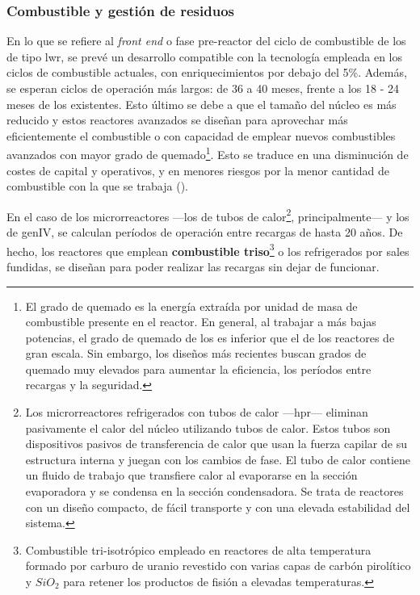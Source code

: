 \newpage
\subsubsection{Combustible y gestión de residuos} \label{combustible}

En lo que se refiere al \emph{front end} o fase pre-reactor del ciclo de combustible de los  de tipo \acrshort{lwr}, se prevé un desarrollo compatible con la tecnología empleada en los ciclos de combustible actuales, con enriquecimientos  por debajo del 5\%. Además, se esperan ciclos de operación más largos: de 36 a 40 meses, frente a los 18 - 24 meses de los  existentes. Esto último se debe a que el tamaño del núcleo es más reducido y estos reactores avanzados se diseñan para aprovechar más eficientemente el combustible o con capacidad de emplear nuevos combustibles avanzados con mayor \gls{grado de quemado}\footnote{El grado de quemado es la energía extraída por unidad de masa de combustible presente en el reactor. En general, al trabajar a más bajas potencias, el grado de quemado de los  es inferior que el de los reactores de gran escala. Sin embargo, los diseños más recientes buscan grados de quemado muy elevados para aumentar la eficiencia, los períodos entre recargas y la seguridad.}. Esto se traduce en una disminución de costes de capital y operativos, y en menores riesgos por la menor cantidad de combustible con la que se trabaja (\cite{overview_smrs}).

En el caso de los microrreactores ---los de \gls{tubos de calor}\footnote{Los microrreactores refrigerados con tubos de calor ---\acrfull{hpr}--- eliminan pasivamente el calor del núcleo  utilizando tubos de calor. Estos tubos son dispositivos pasivos de transferencia de calor que usan la fuerza capilar de su estructura interna y juegan con los cambios de fase. El tubo de calor contiene un fluido de trabajo que transfiere calor al evaporarse en la sección evaporadora y se condensa en la sección condensadora. Se trata de reactores con un diseño compacto, de fácil transporte y con una elevada estabilidad del sistema.}, principalmente--- y los  de \acrshort{genIV}, se calculan períodos de operación entre recargas de hasta 20 años. De hecho, los reactores que emplean \textbf{\gls{combustible} \acrshort{triso}}\footnote{Combustible tri-isotrópico empleado en reactores de alta temperatura formado por carburo de uranio revestido con varias capas de carbón pirolítico y $SiO_2$ para retener los productos de fisión a elevadas temperaturas.} o los refrigerados por sales fundidas, se diseñan para poder realizar las recargas sin dejar de funcionar.

